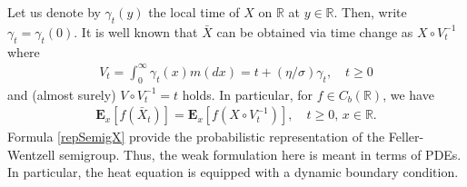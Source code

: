 \documentclass[[11pt,a4paper,reqno]{article}
\numberwithin{equation}{section}
\begin{document}
Let us denote by $\gamma_t(y)$ the local time of $X$ on $\mathbb{R}$ at $y \in \mathbb{R}$. Then, write $\gamma_t = \gamma_t(0)$. It is well known that $\bar{X}$ can be obtained via time change as $X \circ V^{-1}_t$ where 
\begin{align*}
V_t = \int_0^\infty \gamma_t(x) m(dx) = t + (\eta/\sigma) \gamma_t, \quad t\geq 0
\end{align*}
and (almost surely) $V \circ V^{-1}_t = t$ holds. In particular, for $f \in C_b(\mathbb{R})$, we have
\begin{align}
\mathbf{E}_x[f(\bar{X}_t)] = \mathbf{E}_x[f(X\circ V^{-1}_t)], \quad t \geq 0,\, x \in \mathbb{R}.
\label{repSemigX}
\end{align}
Formula \eqref{repSemigX} provide the probabilistic representation of the Feller-Wentzell semigroup. Thus, the weak formulation here is meant in terms of PDEs. In particular, the heat equation is equipped with a dynamic boundary condition.\\
\end{document}

